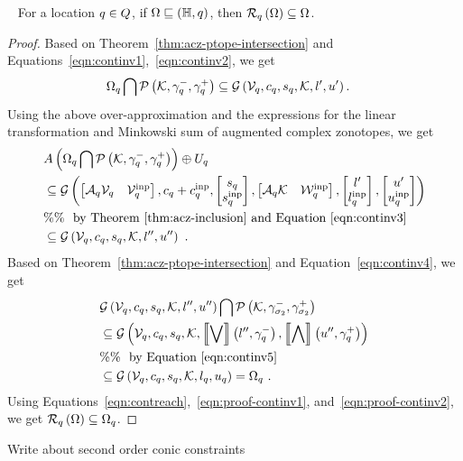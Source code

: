 %
\begin{lemma}~\label{lem:pi-cont}
For a location $q\in Q$, if $\Omega\sqsubseteq\left(\mathbb{H},q\right)$, then
$\mathcal{R}_{q}\left(\Omega\right)\subseteq\Omega$.
\end{lemma}
%
\begin{proof}
Based on Theorem~\ref{thm:acz-ptope-intersection} and Equations~\ref{eqn:continv1},~\ref{eqn:continv2}, we get
%
\begin{align*}
& \Omega_q\bigcap{\mathcal{P}\left(\mathcal{K},\gamma_q^-,\gamma_q^+\right)}
  \subseteq \mathcal{G}\left(\mathcal{V}_q,c_q,s_q,\mathcal{K},l^\prime,u^\prime\right).
\end{align*}
%
Using the above over-approximation and the expressions for the linear
transformation and Minkowski sum of augmented complex zonotopes, we
get
%
\begin{align}
& A\left(\Omega_q\bigcap{\mathcal{P}\left(\mathcal{K},\gamma_q^-,\gamma_q^+\right)}\right)\oplus U_q\nonumber\\
& \subseteq \mathcal{G}\left(
\left[\begin{matrix}\mathcal{A}_q\mathcal{V}_q & \mathcal{V}^{\operatorname{inp}}_q\end{matrix}\right]
,
c_q+c^{\operatorname{inp}}_q
,
\left[\begin{matrix}s_q\\ s^{\operatorname{inp}}_q\end{matrix}\right]
,
\left[\begin{matrix}\mathcal{A}_q\mathcal{K} & \mathcal{W}^{\operatorname{inp}}_q\end{matrix}\right]
,
\left[\begin{matrix}l^\prime\\l^{\operatorname{inp}}_q\end{matrix}\right]
,
\left[\begin{matrix}u^\prime\\ u^{\operatorname{inp}}_q\end{matrix}\right]
\right)\nonumber\\
& \%\%~~\text{by Theorem~\ref{thm:acz-inclusion} and Equation~\ref{eqn:continv3}}\nonumber\\
& \subseteq \mathcal{G}\left(\mathcal{V}_q,c_q,s_q,\mathcal{K},l^{\prime\prime},u^{\prime\prime}\right)~\label{eqn:proof-continv1}.
\end{align}
%
Based on Theorem~\ref{thm:acz-ptope-intersection} and Equation~\ref{eqn:continv4}, we
get
%
\begin{align}
& \mathcal{G}\left(\mathcal{V}_q,c_q,s_q,\mathcal{K},l^{\prime\prime},u^{\prime\prime}\right)\bigcap\mathcal{P}\left(\mathcal{K},\gamma_{\sigma_2}^-,\gamma_{\sigma_2}^+\right)\nonumber\\
& \subseteq \mathcal{G}\left(\mathcal{V}_q,c_q,s_q,\mathcal{K},\left\llbracket\bigvee\right\rrbracket\left(l^{\prime\prime},\gamma_q^-\right),\left\llbracket\bigwedge\right\rrbracket\left(u^{\prime\prime},\gamma_q^+\right)\right)\nonumber\\
& \%\%~~\text{by Equation~\ref{eqn:continv5}}\nonumber\\
& \subseteq \mathcal{G}\left(\mathcal{V}_q,c_q,s_q,\mathcal{K},l_q,u_q\right)=\Omega_q~\label{eqn:proof-continv2}.
\end{align}
%
Using Equations~\ref{eqn:contreach},~\ref{eqn:proof-continv1},
and~\ref{eqn:proof-continv2}, we get
$\mathcal{R}_{q}\left(\Omega\right)\subseteq \Omega_q$.
\end{proof}
%
{\color{red} Write about second order conic constraints}
%

